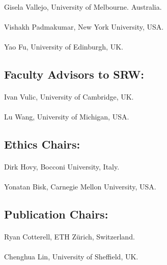 \paragraph{} Gisela Vallejo, University of Melbourne. Australia. 
\paragraph{} Vishakh Padmakumar, New York University, USA. 
\paragraph{} Yao Fu, University of Edinburgh, UK. 

\subsection*{Faculty Advisors to SRW:}
\paragraph{} Ivan Vulic, University of Cambridge, UK. 
\paragraph{} Lu Wang, University of Michigan, USA. 

\subsection*{Ethics Chairs:} 
\paragraph{} Dirk Hovy, Bocconi University, Italy. 
\paragraph{} Yonatan Bisk, Carnegie Mellon University, USA. 

\subsection*{Publication Chairs:}
\paragraph{} Ryan Cotterell, ETH Zürich, Switzerland.
\paragraph{} Chenghua Lin, University of Sheffield, UK. 
